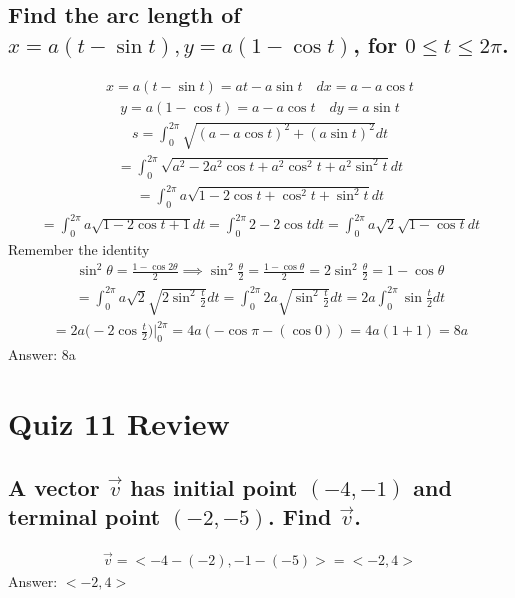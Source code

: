 \documentclass{article}
\begin{document}
\subsection{Find the arc length of $x = a(t - \sin{t}), y = a(1 - \cos{t})$, for $0 \leq t \leq 2\pi$.}
\begin{align*}
	x = a(t - \sin{t}) = at - a\sin{t} \quad dx = a - a\cos{t}
\end{align*}
\begin{align*}
	y = a(1 - \cos{t}) = a - a\cos{t} \quad dy = a\sin{t}
\end{align*}
\begin{align*}
	s = \int_0^{2\pi} \sqrt{(a - a\cos{t})^2 + (a\sin{t})^2}dt 
\end{align*}
\begin{align*}
	= \int_0^{2\pi} {\sqrt{a^2 - 2a^2\cos{t} + a^2\cos^2{t} + a^2\sin^2{t}}}dt
\end{align*}
\begin{align*}
	= \int_0^{2\pi} {a\sqrt{1 - 2\cos{t} + \cos^2{t} + \sin^2{t}}}dt
\end{align*}
\begin{align*}
	= \int_0^{2\pi} {a\sqrt{1 - 2\cos{t} + 1}}dt = \int_0^{2\pi} {2 - 2\cos{t}}dt = \int_0^{2\pi} {a\sqrt{2} \sqrt{1 - \cos{t}}}dt
\end{align*}
Remember the identity
\begin{align*}
	\sin^2{\theta} = \frac{1 - \cos{2\theta}}{2} \implies \sin^2{\frac{\theta}{2}} = \frac{1 - \cos{\theta}}{2} = 2\sin^2{\frac{\theta}{2}} = 1 - \cos{\theta}
\end{align*}
\begin{align*}
	= \int_0^{2\pi} {a\sqrt{2}\sqrt{2\sin^2{\frac{t}{2}}}}dt = \int_0^{2\pi} {2a\sqrt{\sin^2{\frac{t}{2}}}}dt = 2a \int_0^{2\pi} {\sin{\frac{t}{2}}}dt
\end{align*}
\begin{align*}
	= 2a \bigg( -2\cos{\frac{t}{2}}\bigg) \bigg|_0^{2\pi} = 4a(-\cos{\pi} - (\cos{0})) = 4a(1 + 1) = 8a
\end{align*}
Answer: 8a









\newpage
\section{Quiz 11 Review}
\subsection{A vector $\vec{v}$ has initial point $(-4, -1)$ and terminal point $(-2, -5)$. Find $\vec{v}$.}
\begin{align*}
	\vec{v} = <-4 - (-2), -1 - (-5)> = <-2, 4>
\end{align*}
Answer: $<-2,  4>$
\end{document}
